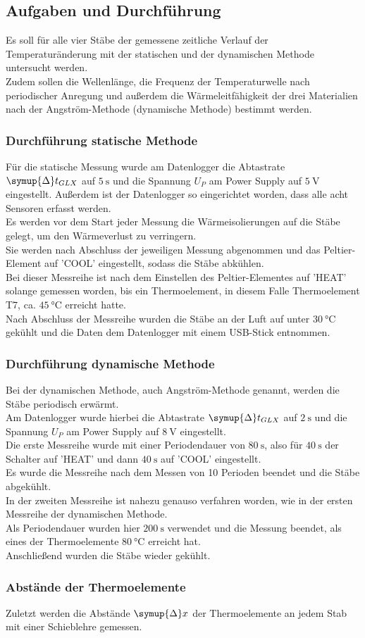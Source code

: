 \subsection{Aufgaben und Durchführung}
\label{subsec:AufgDurch}
Es soll für alle vier Stäbe der gemessene zeitliche Verlauf der Temperaturänderung mit der statischen und
der dynamischen Methode untersucht werden. \\
Zudem sollen die Wellenlänge, die Frequenz der Temperaturwelle
nach periodischer Anregung und außerdem die Wärmeleitfähigkeit der drei Materialien nach
der Angström-Methode (dynamische Methode) bestimmt werden.
\subsubsection{Durchführung statische Methode}
Für die statische Messung wurde am Datenlogger die Abtastrate $\symup{\Delta}t_{GLX}$ auf $\SI{5}{\second}$ und die Spannung
$U_P$ am Power Supply auf $\SI{5}{\volt}$ eingestellt. Außerdem ist der Datenlogger so eingerichtet worden, dass alle acht Sensoren
erfasst werden. \\
Es werden vor dem Start jeder Messung die Wärmeisolierungen auf die Stäbe gelegt, um den Wärmeverlust zu verringern.\\
Sie werden nach Abschluss der jeweiligen Messung abgenommen und das Peltier-Element auf 'COOL' eingestellt, sodass die Stäbe abkühlen.\\
Bei dieser Messreihe ist nach dem Einstellen des Peltier-Elementes auf 'HEAT' solange gemessen worden, bis ein Thermoelement, in diesem Falle
Thermoelement T7, ca. $\SI{45}{\celsius}$ erreicht hatte. \\
Nach Abschluss der Messreihe wurden die Stäbe an der Luft
auf unter $\SI{30}{\celsius}$ gekühlt und die Daten dem Datenlogger mit einem USB-Stick entnommen.
\subsubsection{Durchführung dynamische Methode}
Bei der dynamischen Methode, auch Angström-Methode genannt, werden die Stäbe periodisch erwärmt.\\
Am Datenlogger wurde hierbei die Abtastrate $\symup{\Delta}t_{GLX}$ auf $\SI{2}{\second}$
und die Spannung $U_P$ am Power Supply auf $\SI{8}{\volt}$ eingestellt.\\ 
Die erste Messreihe
wurde mit einer Periodendauer von $\SI{80}{\second}$, also für $\SI{40}{\second}$ der Schalter auf 'HEAT' und dann
$\SI{40}{\second}$ auf 'COOL' eingestellt. \\
Es wurde die Messreihe nach dem Messen von 10 Perioden beendet und die Stäbe abgekühlt.\\
In der zweiten Messreihe ist nahezu genauso verfahren worden, wie in der ersten Messreihe der dynamischen Methode. \\
Als Periodendauer wurden hier
$\SI{200}{\second}$ verwendet und die Messung beendet, als eines der Thermoelemente $\SI{80}{\celsius}$ erreicht hat.\\
Anschließend wurden die Stäbe wieder gekühlt.
\subsubsection{Abstände der Thermoelemente}
Zuletzt werden die Abstände $\symup{\Delta}x$ der Thermoelemente an jedem Stab mit einer Schieblehre gemessen.\\